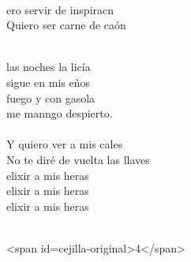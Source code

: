 \begin{cancion}[El Conticinio][Guitarricadelafuente]
\jump\\
	ero servir de inspiracn \\
	Quiero ser carne de caón\\\jump\\
	\begin{chorus}%
	 las noches la licía \\
	sigue en mis eños\\
	 fuego y con gasola \\
	me manngo despierto.\\
\jump\\
	Y quiero ver a mis cales\\
	No te diré de vuelta las llaves\\
	elixir a mis heras   \\
	elixir a mis heras   \\
	elixir a mis heras   \\
	\end{chorus}%
	\jump\\
<span id=cejilla-original>4</span>\\
\end{cancion}%
